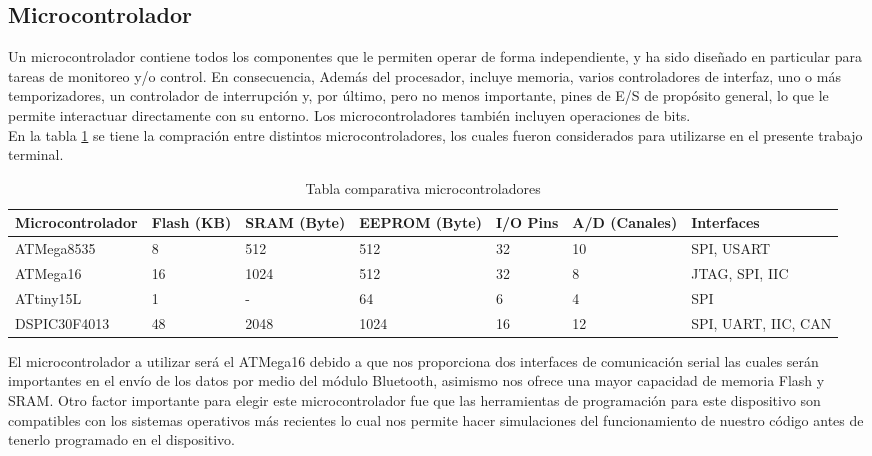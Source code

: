 \subsection{Microcontrolador}\label{sec:micro}
Un microcontrolador contiene todos los componentes que le permiten operar de forma independiente,
y ha sido diseñado en particular para tareas de monitoreo y/o control. En consecuencia,
Además del procesador, incluye memoria, varios controladores de interfaz, uno o
más temporizadores, un controlador de interrupción y, por último, pero no menos importante, pines de E/S de propósito general,
lo que le permite interactuar directamente con su entorno. Los microcontroladores también incluyen operaciones de bits\cite{Micro}.
\\
En la tabla \ref{Tabla_comparativa_microcontroladores} se tiene la compración entre distintos microcontroladores, los cuales fueron considerados para utilizarse en el presente trabajo terminal. 
\begin{table}[H]
	\centering
	\begin{tabular}{|M{3.2cm}|M{1cm}|M{1.3cm}|M{2cm}|M{1.7cm}|M{1.7cm}|M{2cm}|}
		\hline 
		\textbf{Microcontrolador} & \textbf{Flash (KB)} & \textbf{SRAM (Byte)} & \textbf{EEPROM (Byte)} & \textbf{I/O Pins}& \textbf{A/D (Canales)}& \textbf{Interfaces}\\ \hline
		ATMega8535 & 8 & 512 & 512 & 32 & 10 & SPI,  USART \\ \hline
		ATMega16 & 16 & 1024 & 512& 32 & 8& JTAG, SPI, IIC \\ \hline
		ATtiny15L & 1 & - & 64 & 6 & 4 & SPI \\ \hline
		DSPIC30F4013 & 48 & 2048 & 1024 & 16 & 12 & SPI, UART, IIC, CAN \\ \hline
	\end{tabular}
	\caption{Tabla comparativa microcontroladores}
	\label{Tabla_comparativa_microcontroladores}
\end{table}
El microcontrolador a utilizar será el ATMega16 debido a que nos proporciona dos interfaces de comunicación serial las cuales serán importantes en el envío de los datos por medio del módulo Bluetooth, asimismo nos ofrece una mayor capacidad de memoria Flash y SRAM. Otro factor importante para elegir este microcontrolador fue que las herramientas de programación para este dispositivo son compatibles con los sistemas operativos más recientes lo cual nos permite hacer simulaciones del funcionamiento de nuestro código antes de tenerlo programado en el dispositivo.  
